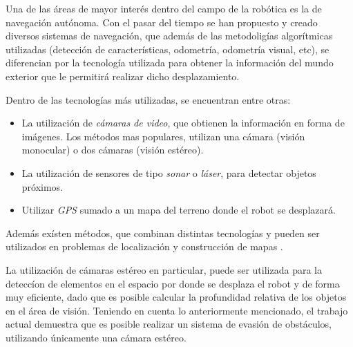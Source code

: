 \documentclass[journal]{IEEEtran}
\begin{document}
Una de las \'areas de mayor inter\'es dentro del campo de la rob\'otica es la de navegaci\'on aut\'onoma. Con el pasar del tiempo se han propuesto y creado diversos sistemas de navegaci\'on, que adem\'as de las metodolig\'ias algor\'itmicas utilizadas (detecci\'on de caracter\'isticas, odometr\'ia, odometr\'ia visual, etc), se diferencian por la tecnolog\'ia utilizada para obtener la informaci\'on del mundo exterior que le permitir\'a realizar dicho desplazamiento.

Dentro de las tecnolog\'ias m\'as utilizadas, se encuentran entre otras:

\begin{itemize}
	\item La utilizaci\'on de \emph{c\'amaras de video}, que obtienen la informaci\'on en forma de im\'agenes. Los m\'etodos mas populares, utilizan una c\'amara (visi\'on monocular) o dos c\'amaras (visi\'on est\'ereo).
	
	\item La utilizaci\'on de sensores de tipo \emph{sonar} o \emph{l\'aser}, para detectar objetos pr\'oximos.
	
	\item Utilizar \emph{GPS} sumado a un mapa del terreno donde el robot se desplazar\'a.
\end{itemize}

Adem\'as ex\'isten m\'etodos, que combinan distintas tecnolog\'ias y pueden ser utilizados en problemas de localizaci\'on y construcci\'on de mapas \cite{KNG10}.

La utilizaci\'on de c\'amaras est\'ereo en particular, puede ser utilizada para la detecc\'ion de elementos en el espacio por donde se desplaza el robot y de forma muy eficiente, dado que es posible calcular la profundidad relativa de los objetos en el \'area de visi\'on. Teniendo en cuenta lo anteriormente mencionado, el trabajo actual demuestra que es posible realizar un sistema de evasi\'on de obst\'aculos, utilizando \'unicamente una c\'amara est\'ereo.
\end{document}
